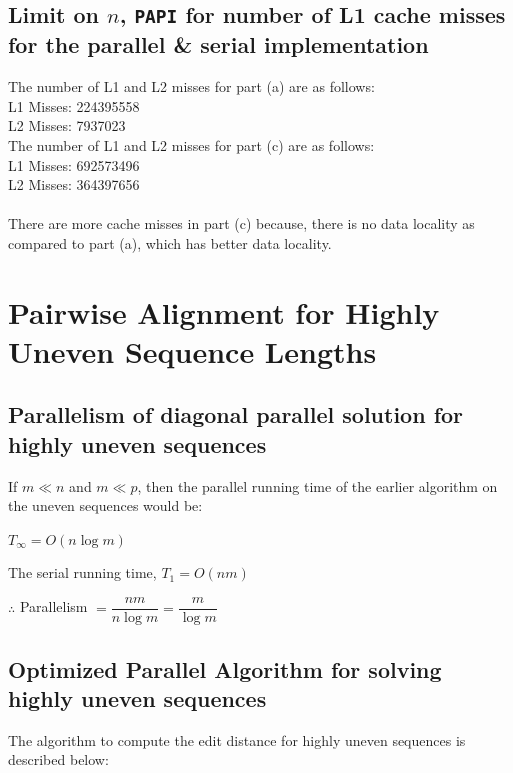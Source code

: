 \documentclass{article}
\begin{document}
\subsection{Limit on $n$, \texttt{PAPI} for number of L1 cache misses for the parallel \& serial implementation}
The number of L1 and L2 misses for part (a) are as follows:\\
L1 Misses: 224395558\\
L2 Misses: 7937023\\

The number of L1 and L2 misses for part (c) are as follows:\\
L1 Misses: 692573496\\
L2 Misses: 364397656\\
\\
There are more cache misses in part (c) because, there is no data locality
as compared to part (a), which has better data locality.

\clearpage

\section{Pairwise Alignment for Highly Uneven Sequence Lengths}

\subsection{Parallelism of diagonal parallel solution for highly uneven sequences}

If $m \ll n$ and $m \ll p$, then the parallel running time of the earlier algorithm on the uneven sequences would be:

$T_{\infty} = O(n\log{m})$

The serial running time, $T_1 = O(nm)$

$\therefore$ Parallelism $= \dfrac{nm}{n\log{m}} = \dfrac{m}{\log{m}}$

\subsection{Optimized Parallel Algorithm for solving highly uneven sequences}

The algorithm to compute the edit distance for highly uneven sequences is described below:
\end{document}
